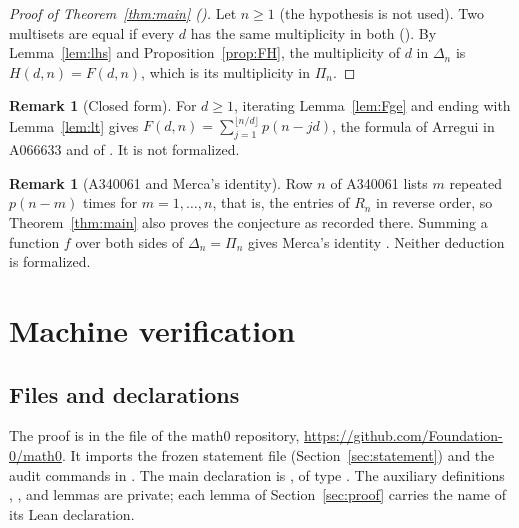 \documentclass[11pt]{amsart}
\theoremstyle{plain}
\theoremstyle{definition}
\newtheorem{remark}[theorem]{Remark}
\begin{document}
\begin{proof}[Proof of Theorem~\ref{thm:main} ()]
Let $n\ge1$ (the hypothesis is not used).
Two multisets are equal if every $d$ has the same multiplicity in both ().
By Lemma~\ref{lem:lhs} and Proposition~\ref{prop:FH}, the multiplicity of $d$ in $\Delta_n$ is $H(d,n)=F(d,n)$, which is its multiplicity in $\Pi_n$.
\end{proof}

\begin{remark}[Closed form]\label{rem:closed}
For $d\ge1$, iterating Lemma~\ref{lem:Fge} and ending with Lemma~\ref{lem:lt} gives $F(d,n)=\sum_{j=1}^{\lfloor n/d\rfloor}p(n-jd)$, the formula of Arregui in A066633 \cite{A066633} and of \cite[Result~2]{DS10}. It is not formalized.
\end{remark}

\begin{remark}[A340061 and Merca's identity]\label{rem:merca}
Row $n$ of A340061 \cite{A340061} lists $m$ repeated $p(n-m)$ times for $m=1,\dots,n$, that is, the entries of $R_n$ in reverse order, so Theorem~\ref{thm:main} also proves the conjecture as recorded there.
Summing a function $f$ over both sides of $\Delta_n=\Pi_n$ gives Merca's identity \cite[Theorem~1]{Mer23}.
Neither deduction is formalized.
\end{remark}

\section{Machine verification}\label{sec:lean}

\subsection*{Files and declarations}
The proof is in the file  of the math0 repository, \url{https://github.com/Foundation-0/math0}.
It imports the frozen statement file  (Section~\ref{sec:statement}) and the audit commands in .
The main declaration is , of type . The auxiliary definitions , ,  and lemmas are private; each lemma of Section~\ref{sec:proof} carries the name of its Lean declaration.
\end{document}
